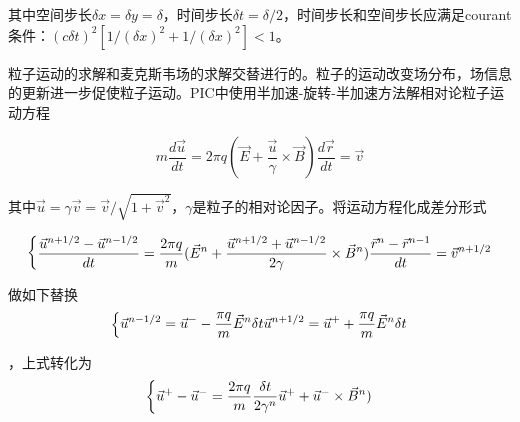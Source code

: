 其中空间步长$\delta x=\delta y=\delta$，时间步长$\delta t= \delta /2$，时间步长和空间步长应满足courant
条件：$(c \delta t)^2 [1/(\delta x)^2 + 1/(\delta x)^2] < 1$。



粒子运动的求解和麦克斯韦场的求解交替进行的。粒子的运动改变场分布，场信息的更新进一步促使粒子运动。PIC中使用半加速-旋转-半加速方法\cite{boris1970relativistic}解相对论粒子运动方程
   
\begin{equation}
\label{eqn:PIC_motion}

m \frac{d \vec{u}}{dt}=2 \pi q (\vec{E} + \frac{\vec{u}}{\gamma} \times \vec{B})
\frac{d \vec{r}}{dt}= \vec{v}

\end{equation} 


其中$\vec{u}=\gamma \vec{v} = \vec{v}/\sqrt{1+ {\vec{v}}^2}$，$\gamma$是粒子的相对论因子。将运动方程化成差分形式


\begin{equation}
\label{eqn:PIC_motion_derivative}
\begin{dcases*}

\frac{\vec{u}^{n+1/2}-\vec{u}^{n-1/2}}{dt}=\frac{2 \pi q }{m} (\vec{E}^n + \frac{\vec{u}^{n+1/2}+\vec{u}^{n-1/2}}{2\gamma} \times \vec{B}^n)
\frac{\vec{r}^{n}-\vec{r}^{n-1}}{dt}= \vec{v}^{n+1/2}

\end{dcases*}
\end{equation} 


做如下替换
\begin{equation}
\label{eqn:PIC_half_acceleration}
\begin{dcases*}

\vec{u}^{n-1/2} = \vec{u}^{-}- \frac{\pi q }{m} \vec{E}^n \delta t
\vec{u}^{n+1/2} = \vec{u}^{+} +\frac{\pi q }{m} \vec{E}^n \delta t

\end{dcases*}
\end{equation} 

，上式转化为
\begin{equation}
\label{eqn:PIC_half_acceleration}
\begin{dcases*}

{\vec{u}^{+}-\vec{u}^{-}}=\frac{2 \pi q }{m} \frac{{\delta} t}{2 {\gamma}^n} {\vec{u}^{+} + \vec{u}^{-}} \times \vec{B}^n)
\end{dcases*}
\end{equation} 


